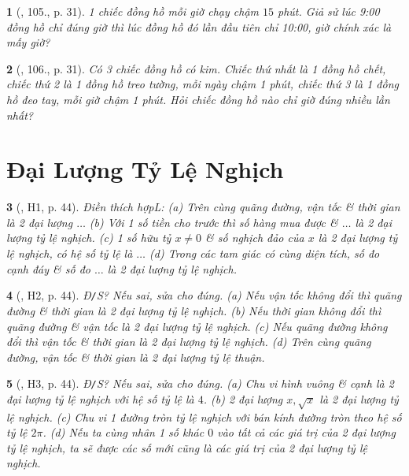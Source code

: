 \documentclass{article}
\newtheorem{baitoan}{}
\begin{document}
\begin{baitoan}[\cite{Binh_Toan_7_tap_1}, 105., p. 31]
	1 chiếc đồng hồ mỗi giờ chạy chậm $15$ phút. Giả sử lúc {\rm9:00} đồng hồ chỉ đúng giờ thì lúc đồng hồ đó lần đầu tiên chỉ {\rm10:00}, giờ chính xác là mấy giờ?
\end{baitoan}

\begin{baitoan}[\cite{Binh_Toan_7_tap_1}, 106., p. 31]
	Có 3 chiếc đồng hồ có kim. Chiếc thứ nhất là 1 đồng hồ chết, chiếc thứ 2 là 1 đồng hồ treo tường, mỗi ngày chậm 1 phút, chiếc thứ 3 là 1 đồng hồ đeo tay, mỗi giờ chậm 1 phút. Hỏi chiếc đồng hồ nào chỉ giờ đúng nhiều lần nhất?
\end{baitoan}


\section{Đại Lượng Tỷ Lệ Nghịch}

\begin{baitoan}[\cite{Binh_boi_duong_Toan_7_tap_1}, H1, p. 44]
	Điền thích hợpL: (a) Trên cùng quãng đường, vận tốc \& thời gian là 2 đại lượng $\ldots$ (b) Với 1 số tiền cho trước thì số hàng mua được \& $\ldots$ là 2 đại lượng tỷ lệ nghịch. (c) 1 số hữu tỷ $x\ne0$ \& số nghịch đảo của $x$ là 2 đại lượng tỷ lệ nghịch, có hệ số tỷ lệ là $\ldots$ (d) Trong các tam giác có cùng diện tích, số đo cạnh đáy \& số đo $\ldots$ là 2 đại lượng tỷ lệ nghịch.
\end{baitoan}

\begin{baitoan}[\cite{Binh_boi_duong_Toan_7_tap_1}, H2, p. 44]
	{\rm Đ{\tt/}S?} Nếu sai, sửa cho đúng. (a) Nếu vận tốc không đổi thì quãng đường \& thời gian là 2 đại lượng tỷ lệ nghịch. (b) Nếu thời gian không đổi thì quãng đường \& vận tốc là 2 đại lượng tỷ lệ nghịch. (c) Nếu quãng đường không đổi thì vận tốc \& thời gian là 2 đại lượng tỷ lệ nghịch. (d) Trên cùng quãng đường, vận tốc \& thời gian là 2 đại lượng tỷ lệ thuận.
\end{baitoan}

\begin{baitoan}[\cite{Binh_boi_duong_Toan_7_tap_1}, H3, p. 44]
	{\rm Đ{\tt/}S?} Nếu sai, sửa cho đúng. (a) Chu vi hình vuông \& cạnh là 2 đại lượng tỷ lệ nghịch với hệ số tỷ lệ là $4$. (b) 2 đại lượng $x,\sqrt{x}$ là 2 đại lượng tỷ lệ nghịch. (c) Chu vi 1 đường tròn tỷ lệ nghịch với bán kính đường tròn theo hệ số tỷ lệ $2\pi$. (d) Nếu ta cùng nhân 1 số khác $0$ vào tất cả các giá trị của 2 đại lượng tỷ lệ nghịch, ta sẽ được các số mới cũng là các giá trị của 2 đại lượng tỷ lệ nghịch.
\end{baitoan}
\end{document}
